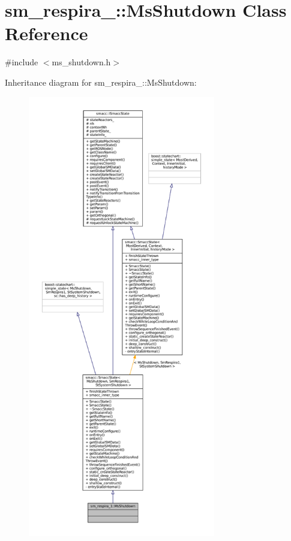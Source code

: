 \hypertarget{classsm__respira__1_1_1MsShutdown}{}\section{sm\+\_\+respira\+\_\+:\+:Ms\+Shutdown Class Reference}
\label{classsm__respira__1_1_1MsShutdown}


{\ttfamily \#include $<$ms\+\_\+shutdown.\+h$>$}



Inheritance diagram for sm\+\_\+respira\+\_\+:\+:Ms\+Shutdown\+:
\nopagebreak
\begin{figure}[H]
\begin{center}
\leavevmode
\includegraphics[height=550pt]{classsm__respira__1_1_1MsShutdown__inherit__graph}
\end{center}
\end{figure}



